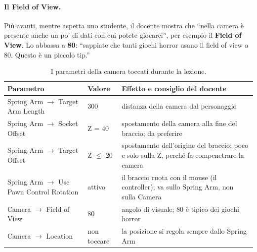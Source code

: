 \paragraph{Il Field of View.} Più avanti, mentre aspetta uno studente, il docente mostra
che ``nella camera è presente anche un po' di dati con cui potete giocarci'', per esempio
il \textbf{Field of View}. Lo abbassa a \textbf{80}: ``sappiate che tanti giochi horror
usano il field of view a 80. Questo è un piccolo tip.''

\begin{table}[htbp]
\centering
\small
\begin{tabular}{@{}p{3.6cm}p{2.0cm}p{8.4cm}@{}}
\toprule
\textbf{Parametro} & \textbf{Valore} & \textbf{Effetto e consiglio del docente} \\
\midrule
Spring Arm $\rightarrow$ Target Arm Length & 300 & distanza della camera dal
personaggio \\
Spring Arm $\rightarrow$ Socket Offset & Z = 40 & spostamento della camera alla fine del
braccio; da preferire \\
Spring Arm $\rightarrow$ Target Offset & Z $\le$ 20 & spostamento dell'origine del
braccio; poco e solo sulla Z, perché fa compenetrare la camera \\
Spring Arm $\rightarrow$ Use Pawn Control Rotation & attivo & il braccio ruota con il
mouse (il controller); va sullo Spring Arm, non sulla Camera \\
Camera $\rightarrow$ Field of View & 80 & angolo di visuale; 80 è tipico dei giochi
horror \\
Camera $\rightarrow$ Location & non toccare & la posizione si regola sempre dallo Spring
Arm \\
\bottomrule
\end{tabular}
\caption{I parametri della camera toccati durante la lezione.}
\label{ue9:tab:camera}
\end{table}


